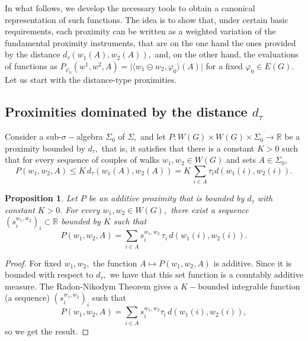 \documentclass[preprint,12pt]{elsarticle}
\newtheorem{proposition}[theorem]{Proposition}
\begin{document}
In what follows, we develop the necessary tools to obtain a canonical representation of such functions. The idea is to show that, under certain basic requirements, each proximity can be written as a weighted variation of the fundamental proximity instruments, that are on the one hand the ones provided by the distance $d_\tau(w_1(A),w_2(A)),$ and, on the other hand, the evaluations of functions as $P_{\varphi_0}(w^1,w^2,A)= \big| \langle w_1 \circleddash w_2, \varphi_0 \rangle (A) \big|$ for a fixed $\varphi_0\in E(G).$ Let us start with the distance-type proximities.

\subsection{Proximities dominated by the distance $d_\tau$} \label{s4.1}

Consider a sub-$\sigma-$algebra $\Sigma_0$ of $\Sigma, $ and let
 $P: W(G) \times W(G) \times \Sigma_0 \to \mathbb R$ be a proximity bounded by $d_\tau,$ that is, it satisfies that there is a constant $K>0$ such that for every sequence of couples of walks $w_1,w_2\in W(G)$ and sets $A\in\Sigma_0$,
$$
P(w_1,w_2,A) \le K \, d_\tau(w_1(A),w_2(A))= K \, \sum_{i \in A} \tau_i d(w_1(i),w_2(i)).
$$

\begin{proposition}
Let $P$ be an additive proximity that is bounded by $d_\tau$ with constant $K>0.$
For every $w_1,w_2\in W(G),$ there exist a sequence $(s^{w_1,w_2}_i)_i {\subset \mathbb R}$  bounded by $K$ such that
$$
P(w_1,w_2,A)= \sum_{i \in A} s^{w_1,w_2}_i \, \tau_i \, d(w_1(i),w_2(i)).
$$
\end{proposition}
\begin{proof}
For fixed $w_1,w_2,$ the function $A \mapsto P(w_1,w_2,A)$ is additive. Since it is bounded with respect to $d_\tau,$ we have that this set function is a countably additive measure. The Radon-Nikodym Theorem gives a $K-$bounded integrable function (a sequence) $(s^{w_1,w_2}_i)_i$ such that
$$
P(w_1,w_2,A)= \sum_{i \in A} s^{w_1,w_2}_i \tau_i \, d(w_1(i),w_2(i)),
$$
so we get the result.
\end{proof}

\end{document}
